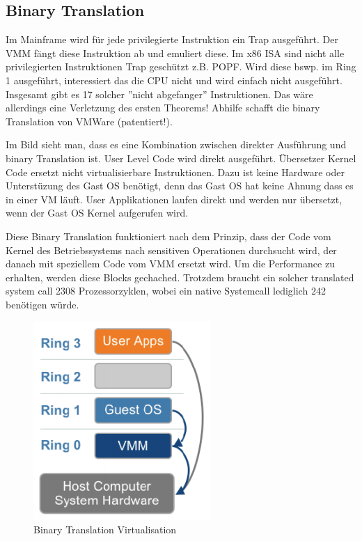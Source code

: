 \subsection{Binary Translation}
Im Mainframe wird für jede privilegierte Instruktion ein Trap ausgeführt. Der VMM fängt diese Instruktion ab und emuliert diese. Im x86 ISA sind nicht alle privilegierten Instruktionen Trap geschützt z.B. POPF. Wird diese bswp. im Ring 1 ausgeführt, interessiert das die CPU nicht und wird einfach nicht ausgeführt. Insgesamt gibt es 17 solcher ''nicht abgefanger'' Instruktionen. Das wäre allerdings eine Verletzung des ersten Theorems! Abhilfe schafft die binary Translation von VMWare (patentiert!).

Im Bild sieht man, dass es eine Kombination zwischen direkter Ausführung und binary Translation ist. User Level Code wird direkt ausgeführt. Übersetzer Kernel Code ersetzt nicht virtualisierbare Instruktionen. Dazu ist keine Hardware oder Unterstüzung des Gast OS benötigt, denn das Gast OS hat keine Ahnung dass es in einer VM läuft. User Applikationen laufen direkt und werden nur übersetzt, wenn der Gast OS Kernel aufgerufen wird.

Diese Binary Translation funktioniert nach dem Prinzip, dass der Code vom Kernel des Betriebssystems nach sensitiven Operationen durchsucht wird, der danach mit speziellem Code vom VMM ersetzt wird. Um die Performance zu erhalten, werden diese Blocks gechached. Trotzdem braucht ein solcher translated system call 2308 Prozessorzyklen, wobei ein native Systemcall lediglich 242 benötigen würde.
\begin{figure}[h!]
\centering
\includegraphics[width=0.4\linewidth]{fig/binary-translation-virt}
\caption{Binary Translation Virtualisation}
\label{fig:binary-translation-virt}
\end{figure}

